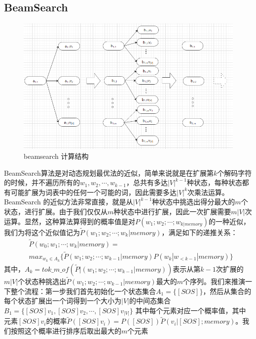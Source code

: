 \documentclass[twoside,a4paper,12pt]{book}%
\begin{document}
\subsection{BeamSearch}
\begin{figure}[htbp]
	\begin{center}
		\includegraphics[width=5.6in]{figures/beamsearch2.png}
		\caption{beamsearch 计算结构}
		\label{fig:beamsearch2}
	\end{center}
\end{figure}
BeamSearch算法是对动态规划最优法的近似，简单来说就是在扩展第$k$个解码字符的时候，并不遍历所有的$w_1,w_2,\cdots,w_{k-1}$，总共有多达$|V|^{k-1}$种状态，每种状态都有可能扩展为词表中的任何一个可能的词，因此需要多达$|V|^k$次乘法运算。BeamSearch 的近似方法非常直接，就是从$|V|^{k-1}$种状态中挑选出得分最大的$m$个状态，进行扩展。由于我们仅仅从$m$种状态中进行扩展，因此一次扩展需要$m|V|$次运算。显然，这种算法算得到的概率值是对$P(w_1;w_2;\cdots;w_{k|memory})$的一种近似，我们为将这个近似值记为$\widetilde{P}(w_1;w_2;\cdots;w_{k}|memory)$，满足如下的递推关系：
$$
\begin{aligned}
&\widetilde{P}(w_0;w_1;\cdots;w_{k}|memory)=\\
&max_{w_k\in A_k}\{ \widetilde{P}(w_1;w_2;\cdots;w_{k-1}|memory)P(w_k|w_{<k-1}|memory) \}
\end{aligned}
$$
其中，$A_k = tok\_m\_of(\widetilde{P}|(w_1;w_2;\cdots;w_{k-1}|memory))$表示从第$k-1$次扩展的$m|V|$个状态种挑选出$\widetilde{P}(w_1;w_2;\cdots;w_{k-1}|memory)$最大的$m$个序列。我们来推演一下整个流程：第一步我们首先初始化一个状态集合$A_1=\{[SOS]\}$，然后从集合的每个状态扩展出一个词得到一个大小为$|V|$的中间态集合
$B_1=\{[SOS]v_1,[SOS]v_2,\cdots,[SOS]v_{|V|}\}$
其中每个元素对应一个概率值，其中元素$[SOS]v_{i}$的概率$\widetilde{P}([SOS]v_{i})=P([SOS])\widetilde{P}(v_i|[SOS];memory)$。我们按照这个概率进行排序后取出最大的$m$个元素
\end{document}
